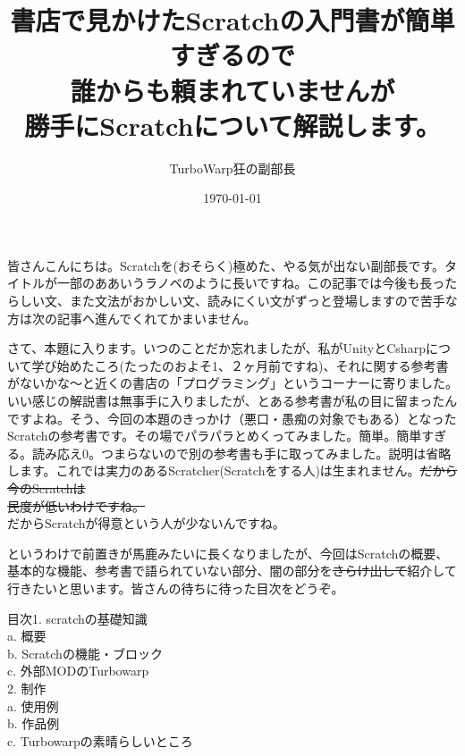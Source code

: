 \documentclass[b5paper,10pt]{jsarticle}
\begin{document}
\title{書店で見かけたScratchの入門書が簡単すぎるので\\誰からも頼まれていませんが\\勝手にScratchについて解説します。}
\author{TurboWarp狂の副部長}
\date{\today}
\maketitle
\thispagestyle{empty}

\begin{multicols*}{3}
  
皆さんこんにちは。Scratchを(おそらく)極めた、やる気が出ない副部長です。タイトルが一部のああいうラノベのように長いですね。この記事では今後も長ったらしい文、また文法がおかしい文、読みにくい文がずっと登場しますので苦手な方は次の記事へ進んでくれてかまいません。

さて、本題に入ります。いつのことだか忘れましたが、私がUnityとCsharpについて学び始めたころ(たったのおよそ1、２ヶ月前ですね)、それに関する参考書がないかな～と近くの書店の「プログラミング」というコーナーに寄りました。いい感じの解説書は無事手に入りましたが、とある参考書が私の目に留まったんですよね。そう、今回の本題のきっかけ（悪口・愚痴の対象でもある）となったScratchの参考書です。その場でパラパラとめくってみました。簡単。簡単すぎる。読み応え0。つまらないので別の参考書も手に取ってみました。説明は省略します。これでは実力のあるScratcher(Scratchをする人)は生まれません。\sout{だから今のScratchは\\民度が低いわけですね。}\\だからScratchが得意という人が少ないんですね。

というわけで前置きが馬鹿みたいに長くなりましたが、今回はScratchの概要、基本的な機能、参考書で語られていない部分、闇の部分を\sout{さらけ出して}紹介して行きたいと思います。皆さんの待ちに待った目次をどうぞ。

\begin{itembox}{目次}{1. }scratchの基礎知識\\{ a. }概要\\{ b. }Scratchの機能・ブロック\\{ c. }外部MODのTurbowarp\\{2. }制作\\{ a. }使用例\\{ b. }作品例\\{ c. }Turbowarpの素晴らしいところ
\end{itembox}


\end{multicols*}
\end{document}
